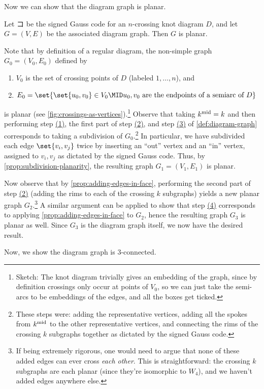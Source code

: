 Now we can show that the diagram graph is planar.
\begin{proposition}
  Let $コ$ be the signed Gauss code for an $n$-crossing knot diagram
  $D$, and let $G = (V, E)$ be the associated diagram graph. Then $G$
  is planar.
\end{proposition}
\begin{sproof}
  Note that by definition of a regular diagram, the non-simple graph
  $G_0 = (V_0, E_0)$ defined by
  \begin{enumerate}
    \item $V_0$ is the set of crossing points of $D$ (labeled
      $1,\ldots, n$), and
    \item $E_0 = \set{\set{u_0,v_0} \in V_0 \MID u_0, v_0 \text{ are
      the endpoints of a semiarc of } D}$
  \end{enumerate}
  is planar (see \cref{fig:crossings-as-vertices}).\footnote{Sketch:
    The knot diagram trivially gives an embedding of the graph, since
    by definition crossings only occur at points of $V_0$, so we can
    just take the semi-arcs to be embeddings of the edges, and all the
    boxes get ticked.} Observe that taking $k^{\rm mid} = k$ and then
  performing step \hyperlink{graph-step-1}{(1)}, the first part of
  step \hyperlink{graph-step-2}{(2)}, and step
  \hyperlink{graph-step-3}{(3)} of \cref{def:diagram-graph}
  corresponds to taking a subdivision of $G_0$.\footnote{These steps
    were:  adding the
    representative vertices,  adding all the spokes from
    $k^{\rm mid}$ to the other representative vertices, and  connecting the rims of the
    crossing $k$ subgraphs together as dictated by the signed Gauss
    code.} In particular, we have subdivided each edge $\set{v_i,
    v_j}$ twice by inserting an ``out'' vertex and an ``in'' vertex,
  assigned to $v_i, v_j$ as dictated by the signed Gauss code. Thus,
  by \cref{prop:subdivision-planarity}, the resulting graph $G_1 =
  (V_1, E_1)$ is planar.

  Now observe that by \cref{prop:adding-edges-in-face}, performing the
  second part of step \hyperlink{graph-step-2}{(2)} (adding the rims
  to each of the crossing $k$ subgraphs) yields a new planar graph
  $G_2$.\footnote{If being extremely rigorous, one would need to argue
    that none of these added edges can ever cross \emph{each other}.
    This is straightforward: the crossing $k$ subgraphs are each
    planar (since they're isomorphic to $W_4$), and we haven't added
    edges anywhere else.} A similar argument can be applied to show
  that step \hyperlink{graph-step-4}{(4)} corresponds to applying
  \cref{prop:adding-edges-in-face} to $G_2$, hence the resulting graph
  $G_3$ is planar as well. Since $G_3$ is the diagram graph itself, we
  now have the desired result.
\end{sproof}
Now, we show the diagram graph is $3$-connected.
